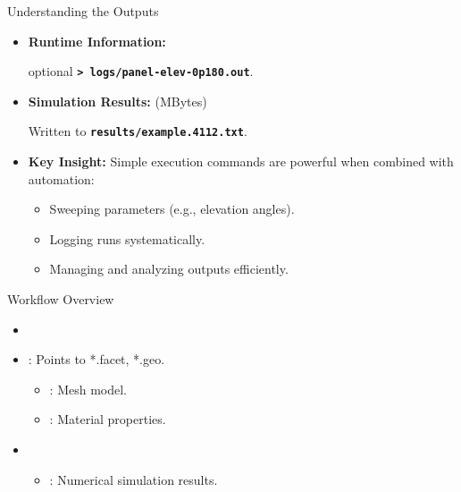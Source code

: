 \begin{frame}{Understanding the Outputs}
\begin{itemize}
    \item \textbf{Runtime Information:}
    \begin{center}
        optional \texttt{\textbf{> logs/panel-elev-0p180.out}}.
    \end{center}
    \vspace{0.3cm}
    \item \textbf{Simulation Results:} (MBytes)
    \begin{center}
        Written to \texttt{\textbf{results/example.4112.txt}}.
    \end{center}
    \vspace{0.3cm}
    \item \textbf{Key Insight:}  
    Simple execution commands are powerful when combined with automation:
    \begin{itemize}
        \item Sweeping parameters (e.g., elevation angles).  
        \item Logging runs systematically.  
        \item Managing and analyzing outputs efficiently.  
    \end{itemize}
\end{itemize}
\end{frame}

\begin{frame}{Workflow Overview}
\begin{itemize}
    \item {}
            \item {}: Points to *.facet, *.geo.
        \begin{itemize}
            \item {}: Mesh model.
            \item {}: Material properties.
        \end{itemize}
    \item {}
        \begin{itemize}
            \item {}: Numerical simulation results.
        \end{itemize}
\end{itemize}
\end{frame}

